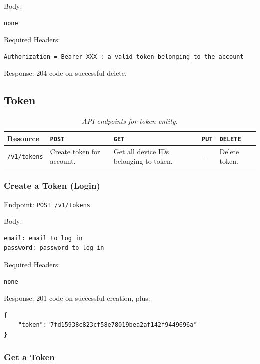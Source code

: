 \documentclass[12pt,openany,a4paper]{book}
\begin{document}
Body:
\begin{verbatim}
none
\end{verbatim}

Required Headers: 

\begin{verbatim}
Authorization = Bearer XXX : a valid token belonging to the account
\end{verbatim}

Response: 204 code on successful delete.

\subsection{Token}

\begin{table}[h]
\caption{\sl API endpoints for token entity.}
\label{tab:endpoint_token}
\begin{center}
\begin{tabularx}{\linewidth}{|l|X|X|X|X|}
\hline
Resource & \verb|POST| & \verb|GET| & \verb|PUT| & \verb|DELETE| \\
\hline
\verb|/v1/tokens| & Create token for account. & Get all device IDs belonging to token. & -- & Delete token. \\
\hline
\end{tabularx}
\end{center}
\end{table}

\subsubsection{Create a Token (Login)}

Endpoint: \verb|POST /v1/tokens|

Body:

\begin{verbatim}
email: email to log in
password: password to log in
\end{verbatim}

Required Headers:

\begin{verbatim}
none
\end{verbatim}

Response: 201 code on successful creation, plus:

\begin{verbatim}
{
	"token":"7fd15938c823cf58e78019bea2af142f9449696a"
}
\end{verbatim}

\subsubsection{Get a Token}
\end{document}
